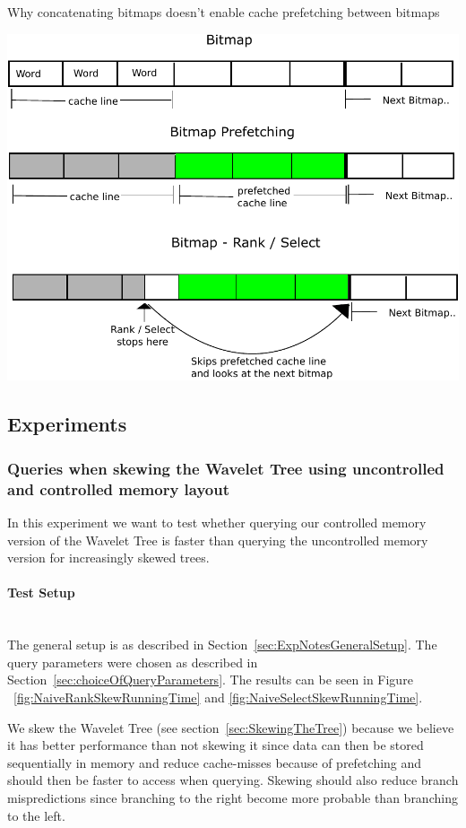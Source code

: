 \figureBegin
\caption{Why concatenating bitmaps doesn't enable cache prefetching between bitmaps}
\label{fig:QueryPrefetchFigure}
\includegraphics[width=\textwidth]{QueryPrefetchFigure.pdf}
\figureEnd



\subsection{Experiments}

\subsubsection{Queries when skewing the Wavelet Tree using uncontrolled and controlled memory layout}
In this experiment we want to test whether querying our controlled memory version of the Wavelet Tree is faster than querying the uncontrolled memory version for increasingly skewed trees. 

\paragraph{Test Setup}~\\
The general setup is as described in Section~\ref{sec:ExpNotesGeneralSetup}.
The query parameters were chosen as described in Section~\ref{sec:choiceOfQueryParameters}.
The results can be seen in Figure ~\ref{fig:NaiveRankSkewRunningTime} and \ref{fig:NaiveSelectSkewRunningTime}.

We skew the Wavelet Tree (see section~\ref{sec:SkewingTheTree}) because we believe it has better performance than not skewing it since data can then be stored sequentially in memory and reduce cache-misses because of prefetching and should then be faster to access when querying.
Skewing should also reduce branch mispredictions since branching to the right become more probable than branching to the left. 

